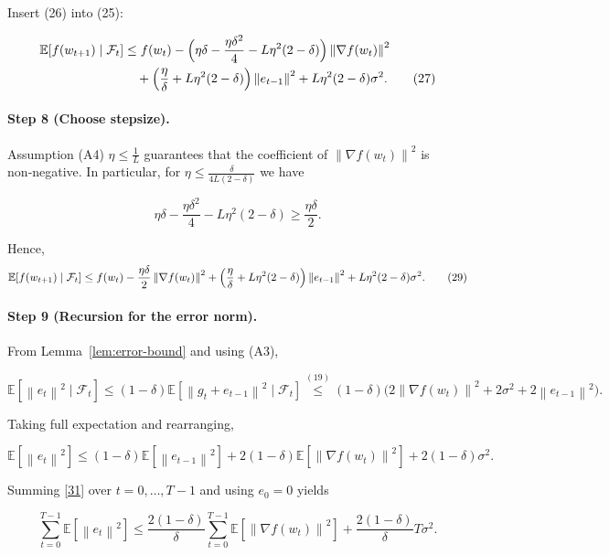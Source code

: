 \documentclass{article}
\newcommand{\E}{\mathbb{E}}
\newcommand{\norm}[1]{\left\|#1\right\|}
\begin{document}
Insert (26) into (25):

\[
\begin{aligned}
\E\!\left[f(w_{t+1})\mid\mathcal{F}_{t}\right]
&\le f(w_{t})
-\Bigl(\eta\delta-\frac{\eta\delta^{2}}{4}-L\eta^{2}(2-\delta)\Bigr)\norm{\nabla f(w_{t})}^{2}\\
&\quad +\Bigl(\frac{\eta}{\delta}+L\eta^{2}(2-\delta)\Bigr)\norm{e_{t-1}}^{2}
+L\eta^{2}(2-\delta)\sigma^{2}. \tag{27}
\end{aligned}
\]

\paragraph{Step 8 (Choose stepsize).}
Assumption (A4) $\eta\le\frac{1}{L}$ guarantees that the coefficient of $\norm{\nabla f(w_{t})}^{2}$ is non‑negative. In particular, for $\eta\le\frac{\delta}{4L(2-\delta)}$ we have

\[
\eta\delta-\frac{\eta\delta^{2}}{4}-L\eta^{2}(2-\delta)\ge\frac{\eta\delta}{2}. \tag{28}
\]

Hence,
\[
\E\!\left[f(w_{t+1})\mid\mathcal{F}_{t}\right]
\le f(w_{t})-\frac{\eta\delta}{2}\norm{\nabla f(w_{t})}^{2}
+ \Bigl(\frac{\eta}{\delta}+L\eta^{2}(2-\delta)\Bigr)\norm{e_{t-1}}^{2}
+L\eta^{2}(2-\delta)\sigma^{2}. \tag{29}
\]

\paragraph{Step 9 (Recursion for the error norm).}
From Lemma~\ref{lem:error-bound} and using (A3),

\[
\E\!\left[\norm{e_{t}}^{2}\mid\mathcal{F}_{t}\right]
\le (1-\delta)\E\!\left[\norm{g_{t}+e_{t-1}}^{2}\mid\mathcal{F}_{t}\right]
\stackrel{(19)}{\le}
(1-\delta)\bigl(2\norm{\nabla f(w_{t})}^{2}+2\sigma^{2}+2\norm{e_{t-1}}^{2}\bigr). \tag{30}
\]

Taking full expectation and rearranging,

\[
\E\!\left[\norm{e_{t}}^{2}\right]\le (1-\delta)\E\!\left[\norm{e_{t-1}}^{2}\right]
+2(1-\delta)\E\!\left[\norm{\nabla f(w_{t})}^{2}\right]
+2(1-\delta)\sigma^{2}. \tag{31}
\]

Summing \eqref{31} over $t=0,\dots ,T-1$ and using $e_{0}=0$ yields

\[
\sum_{t=0}^{T-1}\E\!\left[\norm{e_{t}}^{2}\right]
\le \frac{2(1-\delta)}{\delta}\sum_{t=0}^{T-1}\E\!\left[\norm{\nabla f(w_{t})}^{2}\right]
+\frac{2(1-\delta)}{\delta}T\sigma^{2}. \tag{32}
\]
\end{document}
